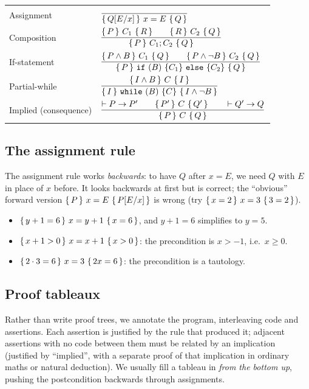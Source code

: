 \renewcommand{\arraystretch}{1.3}
\begin{center}
\begin{tabular}{ll}
Assignment &
 $\dfrac{}{\{\,Q[E/x]\,\}\ x = E\ \{\,Q\,\}}$\\[3ex]
Composition &
 $\dfrac{\{\,P\,\}\ C_1\ \{\,R\,\}\qquad\{\,R\,\}\ C_2\ \{\,Q\,\}}{\{\,P\,\}\ C_1;C_2\ \{\,Q\,\}}$\\[3ex]
If-statement &
 $\dfrac{\hoare{P\land B}{C_1}{Q}\qquad\hoare{P\land\neg B}{C_2}{Q}}
        {\hoare{P}{\code{if}\ (B)\ \{C_1\}\ \code{else}\ \{C_2\}}{Q}}$\\[3ex]
Partial-while &
 $\dfrac{\{\,I\land B\,\}\ C\ \{\,I\,\}}{\{\,I\,\}\ \texttt{while}\ (B)\ \{C\}\ \{\,I\land\neg B\,\}}$\\[3ex]
Implied (consequence) &
 $\dfrac{\vdash P\to P'\qquad\{\,P'\,\}\ C\ \{\,Q'\,\}\qquad\vdash Q'\to Q}{\{\,P\,\}\ C\ \{\,Q\,\}}$
\end{tabular}
\end{center}
\renewcommand{\arraystretch}{1}

\subsection{The assignment rule}

The assignment rule works \emph{backwards}: to have $Q$ after $x=E$, we need $Q$ with $E$
in place of $x$ before. It looks backwards at first but is correct; the ``obvious''
forward version $\{\,P\,\}\ x=E\ \{\,P[E/x]\,\}$ is wrong (try $\{\,x=2\,\}\ x=3\ \{\,3=2\,\}$).

\begin{example}
\begin{itemize}
  \item $\{\,y+1=6\,\}\ x = y+1\ \{\,x=6\,\}$, and $y+1=6$ simplifies to $y=5$.
  \item $\{\,x+1>0\,\}\ x = x+1\ \{\,x>0\,\}$: the precondition is $x>-1$, i.e.\ $x\ge0$.
  \item $\{\,2\cdot 3 = 6\,\}\ x = 3\ \{\,2x=6\,\}$: the precondition is a tautology.
\end{itemize}
\end{example}

\subsection{Proof tableaux}

Rather than write proof trees, we annotate the program, interleaving code and assertions.
Each assertion is justified by the rule that produced it; adjacent assertions with no code
between them must be related by an implication (justified by ``implied'', with a separate
proof of that implication in ordinary maths or natural deduction). We usually fill a
tableau in \emph{from the bottom up}, pushing the postcondition backwards through
assignments.

